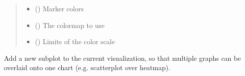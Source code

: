 \documentclass[letterpaper,10pt,english,openany,oneside]{sphinxmanual}
\begin{document}
\begin{fulllineitems}
\begin{fulllineitems}
\begin{quote}
\begin{description}
\begin{itemize}
\item {} 
 () \textendash{} Marker colors

\item {} 
 (\sphinxstyleliteralemphasis{\sphinxupquote{, }}\sphinxstyleliteralemphasis{\sphinxupquote{, }}) \textendash{} The colormap to use

\item {} 
 (\sphinxstyleliteralemphasis{\sphinxupquote{ {[}}}\sphinxstyleliteralemphasis{\sphinxupquote{{]}}}\sphinxstyleliteralemphasis{\sphinxupquote{, }}\sphinxstyleliteralemphasis{\sphinxupquote{, }}\sphinxstyleliteralemphasis{\sphinxupquote{(}}\sphinxstyleliteralemphasis{\sphinxupquote{,}}\sphinxstyleliteralemphasis{\sphinxupquote{)}}) \textendash{} Limits of the color scale

\end{itemize}

\end{description}\end{quote}

\end{fulllineitems}


\begin{fulllineitems}
\label{\detokenize{pygpc:pygpc.Visualization.Visualization.create_new_chart}}
Add a new subplot to the current visualization, so that multiple graphs can be overlaid onto one chart
(e.g. scatterplot over heatmap).


\end{fulllineitems}
\end{fulllineitems}
\end{document}
